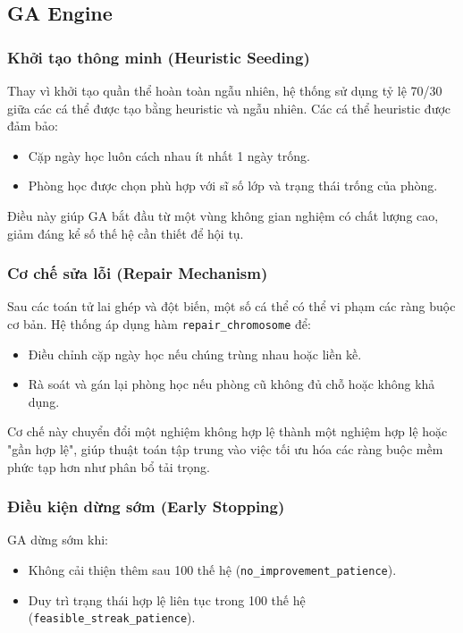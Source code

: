 \subsection{GA Engine}


\subsubsection{Khởi tạo thông minh (Heuristic Seeding)}
Thay vì khởi tạo quần thể hoàn toàn ngẫu nhiên, hệ thống sử dụng tỷ lệ 70/30 giữa các cá thể được tạo bằng heuristic và ngẫu nhiên. Các cá thể heuristic được đảm bảo:
\begin{itemize}
    \item Cặp ngày học luôn cách nhau ít nhất 1 ngày trống.
    \item Phòng học được chọn phù hợp với sĩ số lớp và trạng thái trống của phòng.
\end{itemize}
Điều này giúp GA bắt đầu từ một vùng không gian nghiệm có chất lượng cao, giảm đáng kể số thế hệ cần thiết để hội tụ.

\subsubsection{Cơ chế sửa lỗi (Repair Mechanism)}
Sau các toán tử lai ghép và đột biến, một số cá thể có thể vi phạm các ràng buộc cơ bản. Hệ thống áp dụng hàm \texttt{repair\_chromosome} để:
\begin{itemize}
    \item Điều chỉnh cặp ngày học nếu chúng trùng nhau hoặc liền kề.
    \item Rà soát và gán lại phòng học nếu phòng cũ không đủ chỗ hoặc không khả dụng.
\end{itemize}
Cơ chế này chuyển đổi một nghiệm không hợp lệ thành một nghiệm hợp lệ hoặc "gần hợp lệ", giúp thuật toán tập trung vào việc tối ưu hóa các ràng buộc mềm phức tạp hơn như phân bổ tải trọng.

\subsubsection{Điều kiện dừng sớm (Early Stopping)}
GA dừng sớm khi:
\begin{itemize}
    \item Không cải thiện thêm sau 100 thế hệ (\texttt{no\_improvement\_patience}).
    \item Duy trì trạng thái hợp lệ liên tục trong 100 thế hệ (\texttt{feasible\_streak\_patience}).
\end{itemize}

